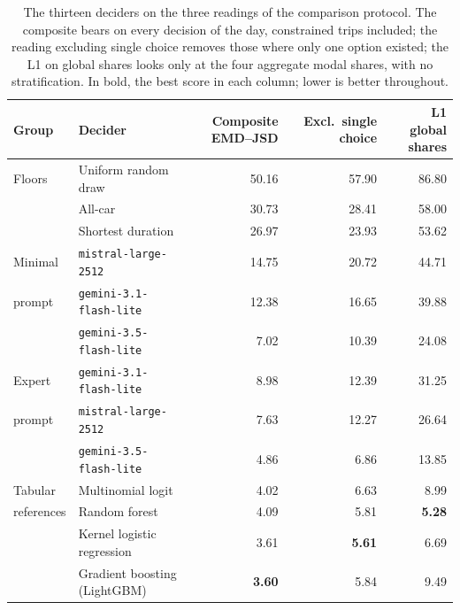 \begin{table}[tp]
  \caption{The thirteen deciders on the three readings of the comparison protocol. The composite bears on every decision of the day, constrained trips included; the reading excluding single choice removes those where only one option existed; the L1 on global shares looks only at the four aggregate modal shares, with no stratification. In bold, the best score in each column; lower is better throughout.}
  \label{tab:scale}
  \begin{tabular}{llrrr}
    \toprule
    Group & Decider & Composite EMD--JSD & Excl.\ single choice & L1 global shares \\
    \midrule
    Floors     & Uniform random draw                            & 50.16 & 57.90 & 86.80 \\
               & All-car                                        & 30.73 & 28.41 & 58.00 \\
               & Shortest duration                              & 26.97 & 23.93 & 53.62 \\
    \midrule
    Minimal    & \texttt{mistral-large-2512}                    & 14.75 & 20.72 & 44.71 \\
    prompt     & \texttt{gemini-3.1-flash-lite}                 & 12.38 & 16.65 & 39.88 \\
               & \texttt{gemini-3.5-flash-lite}                 &  7.02 & 10.39 & 24.08 \\
    \midrule
    Expert     & \texttt{gemini-3.1-flash-lite}                 &  8.98 & 12.39 & 31.25 \\
    prompt     & \texttt{mistral-large-2512}                    &  7.63 & 12.27 & 26.64 \\
               & \texttt{gemini-3.5-flash-lite}                 &  4.86 &  6.86 & 13.85 \\
    \midrule
    Tabular    & Multinomial logit                              &  4.02 &  6.63 &  8.99 \\
    references & Random forest                                  &  4.09 &  5.81 & \textbf{5.28} \\
               & Kernel logistic regression                     &  3.61 & \textbf{5.61} &  6.69 \\
               & Gradient boosting (LightGBM)                   & \textbf{3.60} &  5.84 &  9.49 \\
    \bottomrule
  \end{tabular}
\end{table}

